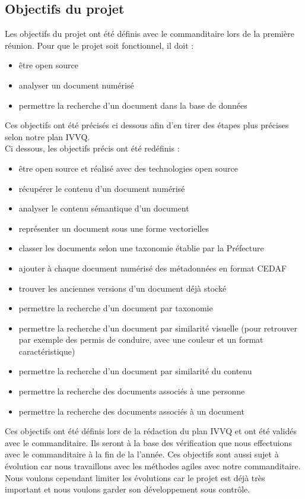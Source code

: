 

\subsection {Objectifs du projet}

Les objectifs du projet ont été définis avec le commanditaire lors de la première réunion.
Pour que le projet soit fonctionnel, il doit :
\begin {itemize}
\item être open source
\item analyser un document numérisé
\item permettre la recherche d'un document dans la base de données
\newline
\end {itemize}
Ces objectifs ont été précisés ci dessous afin d'en tirer des étapes plus précises selon notre plan IVVQ. \\ 

Ci dessous, les objectifs précis ont été redéfinis :
\begin {itemize}
\item être open source et réalisé avec des technologies open source
\item récupérer le contenu d'un document numérisé
\item analyser le contenu sémantique d’un document
\item représenter un document sous une forme vectorielles
\item classer les documents selon une taxonomie établie par la Préfecture
\item ajouter à chaque document numérisé des métadonnées en format CEDAF
\item trouver les anciennes versions d’un document déjà stocké
\item permettre la recherche d’un document par taxonomie
\item permettre la recherche d’un document par similarité visuelle (pour retrouver par exemple des permis de conduire, avec une couleur et un format caractéristique)
\item permettre la recherche d’un document par similarité du contenu
\item permettre la recherche des documents associés à une personne
\item permettre la recherche des documents associés à un document
\end {itemize}

Ces objectifs ont été définis lors de la rédaction du plan IVVQ et ont été validés avec le commanditaire.
Ils seront à la base des vérification que nous effectuions avec le commanditaire à la fin de la l'année.
Ces objectifs sont aussi sujet à évolution car nous travaillons avec les méthodes agiles avec notre commanditaire.
Nous voulons cependant limiter les évolutions car le projet est déjà très important et nous voulons garder son développement sous contrôle.



